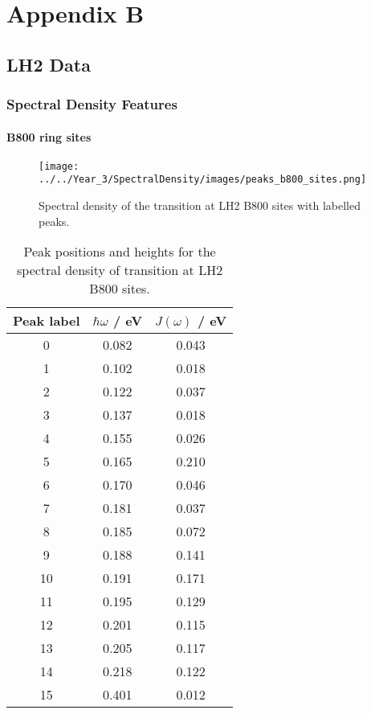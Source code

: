 %
%

\chapter{Appendix B}
\label{app:app02}
\section{LH2 Data}
\label{sec:lh2_data}

\subsection{Spectral Density Features}
\label{subsec:specdens_features}
\subsubsection{B800 ring sites}
\label{subsubsec:specdens_b800}

\begin{figure}
    \centering
    \texttt{[image: ../../Year\_3/SpectralDensity/images/peaks\_b800\_sites.png]}
    \caption{Spectral density of the \Qy transition at LH2 B800 sites with labelled
    peaks.}
    \label{fig:b800_lablled_peaks}
\end{figure}

\begin{table}
    \centering
    \begin{tabular}{||c c c||}
    \hline
    Peak label & $\hbar \omega$ / eV & $J\left(\omega\right)$ / eV \\
    \hline\hline
    
     0 & 0.082 & 0.043 \\
     1 & 0.102 & 0.018 \\
     2 & 0.122 & 0.037 \\
     3 & 0.137 & 0.018 \\
     4 & 0.155 & 0.026 \\
     5 & 0.165 & 0.210 \\
     6 & 0.170 & 0.046 \\
     7 & 0.181 & 0.037 \\
     8 & 0.185 & 0.072 \\
     9 & 0.188 & 0.141 \\
     10 & 0.191 & 0.171 \\
     11 & 0.195 & 0.129 \\
     12 & 0.201 & 0.115 \\
     13 & 0.205 & 0.117 \\
     14 & 0.218 & 0.122 \\
     15 & 0.401 & 0.012 \\
    \hline 
    \end{tabular}
    \caption{Peak positions and heights for the spectral density of \Qy transition 
    at LH2 B800 sites.}
    \label{tab:b800_lablled_peaks}
\end{table}

